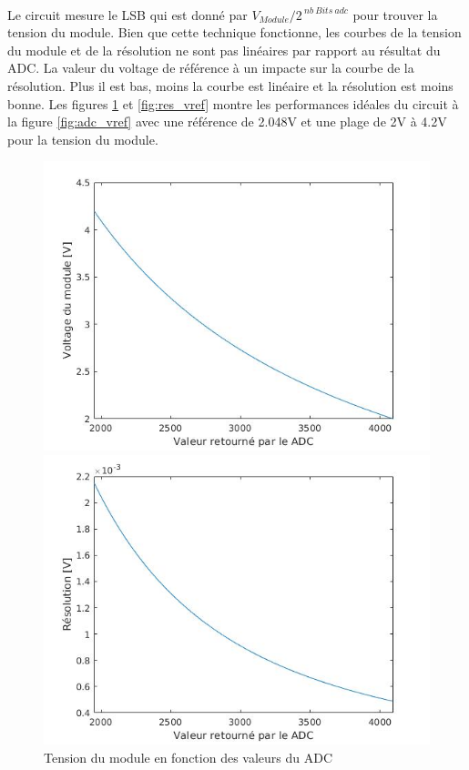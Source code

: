 	\paragraph*{}
	Le circuit mesure le LSB qui est donné par $V_{Module} / 2^{~nb~Bits~adc}$ pour  trouver la tension du module. Bien que cette technique fonctionne, les courbes de la tension du module et de la résolution ne sont pas linéaires par rapport au résultat du ADC. La valeur du voltage de référence à un impacte sur la courbe de la résolution. Plus il est bas, moins la courbe est linéaire et la résolution est moins bonne. Les figures \ref{fig:vmodule_vref} et \ref{fig:res_vref} montre les performances idéales du circuit à la figure \ref{fig:adc_vref} avec une référence de 2.048V et une plage de 2V à 4.2V pour la tension du module.
	
	\begin{figure}[H]
		\begin{minipage}{0.45\textwidth}
			\centering
			\includegraphics[scale=0.4]{Images/Vmodule_REF_2V.jpg}
			\caption{Tension du module en fonction des valeurs du ADC}
			\label{fig:vmodule_vref}
		\end{minipage}
		\hfill
		\begin{minipage}{0.45\textwidth}
			\centering
			\includegraphics[scale=0.4]{Images/RES_REF_2V.jpg}

\end{minipage}
\end{figure}
